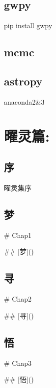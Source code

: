\documentclass[letterpaper,10pt,english]{sphinxmanual}
\begin{document}
\section{gwpy}
\label{\detokenize{advanced/02_gwpy::doc}}\label{\detokenize{advanced/02_gwpy:gwpy}}
pip install gwpy


\section{mcmc}
\label{\detokenize{advanced/03_mcmc:mcmc}}\label{\detokenize{advanced/03_mcmc::doc}}

\section{astropy}
\label{\detokenize{advanced/04_astropy:astropy}}\label{\detokenize{advanced/04_astropy::doc}}
anaconda2\&3


\chapter{曜灵篇:}
\label{\detokenize{poem/index::doc}}\label{\detokenize{poem/index:id1}}

\section{序}
\label{\detokenize{poem/Preface::doc}}\label{\detokenize{poem/Preface:id1}}
曜灵集序


\section{梦}
\label{\detokenize{poem/Chap1::doc}}\label{\detokenize{poem/Chap1:id2}}\label{\detokenize{poem/Chap1:id1}}
\# Chap1

\#\# {[}梦{]}()


\section{寻}
\label{\detokenize{poem/Chap2::doc}}\label{\detokenize{poem/Chap2:id1}}
\# Chap2

\#\# {[}寻{]}()


\section{悟}
\label{\detokenize{poem/Chap3::doc}}\label{\detokenize{poem/Chap3:id1}}
\# Chap3

\#\# {[}悟{]}()
\end{document}
